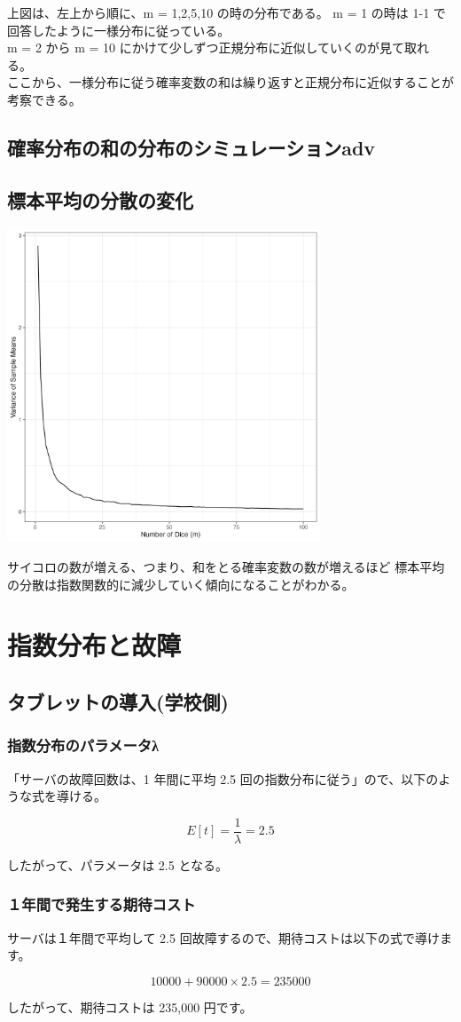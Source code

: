 \documentclass{article}
\begin{document}
上図は、左上から順に、m = 1,2,5,10 の時の分布である。 
m = 1 の時は 1-1 で回答したように一様分布に従っている。\\
m = 2 から m = 10 にかけて少しずつ正規分布に近似していくのが見て取れる。\\
ここから、一様分布に従う確率変数の和は繰り返すと正規分布に近似することが考察できる。

\subsection{確率分布の和の分布のシミュレーションadv}

\subsection{標本平均の分散の変化}
	\begin{center}
		\includegraphics[width=0.7\textwidth]{1-4_plot.png}
	\end{center}

サイコロの数が増える、つまり、和をとる確率変数の数が増えるほど
標本平均の分散は指数関数的に減少していく傾向になることがわかる。

\section{指数分布と故障}
\subsection{タブレットの導入(学校側)}
\subsubsection{指数分布のパラメータλ}

「サーバの故障回数は、1 年間に平均 2.5 回の指数分布に従う」ので、以下のような式を導ける。

\[ E[t] = \frac{1}{\lambda} = 2.5 \]

したがって、パラメータ\lambda は 2.5 となる。

\subsubsection{１年間で発生する期待コスト}

サーバは１年間で平均して 2.5 回故障するので、期待コストは以下の式で導けます。

\[ 10000 + 90000 \times 2.5 = 235000 \]

したがって、期待コストは 235,000 円です。
\end{document}
